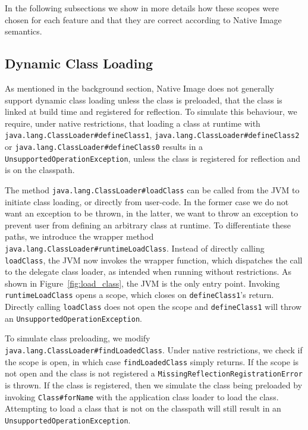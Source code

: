 In the following subsections we show in more details how these scopes were chosen for each feature and that they are correct according to Native Image semantics.

\subsection{Dynamic Class Loading}
As mentioned in the background section, Native Image does not generally support dynamic class loading unless the class is preloaded, that the class is linked at build time and registered for reflection.
To simulate this behaviour, we require, under native restrictions, that loading a class at runtime with \verb|java.lang.ClassLoader#defineClass1|, \verb|java.lang.ClassLoader#defineClass2| or \verb|java.lang.ClassLoader#defineClass0| results in a \verb|UnsupportedOperationException|, unless the class is registered for reflection and is on the classpath.

The method \verb|java.lang.ClassLoader#loadClass| can be called from the JVM to initiate class loading, or directly from user-code. In the former case we do not want an exception to be thrown, in the latter, we want to throw an exception to prevent user from defining an arbitrary class at runtime.
To differentiate these paths, we introduce the wrapper method \verb|java.lang.ClassLoader#runtimeLoadClass|. Instead of directly calling \verb|loadClass|, the JVM now invokes the wrapper function, which dispatches the call to the delegate class loader, as intended when running without restrictions. As shown in Figure~\ref{fig:load_class}, the JVM is the only entry point.
Invoking \verb|runtimeLoadClass| opens a scope, which closes on \verb|defineClass1|'s return.
Directly calling \verb|loadClass| does not open the scope and \verb|defineClass1| will throw an \verb|UnsupportedOperationException|.

To simulate class preloading, we modify \verb|java.lang.ClassLoader#findLoadedClass|.
Under native restrictions, we check if the scope is open, in which case \verb|findLoadedClass| simply returns. If the scope is not open and the class is not registered a \verb|MissingReflectionRegistrationError| is thrown.
If the class is registered, then we simulate the class being preloaded by invoking \verb|Class#forName| with the application class loader to load the class. Attempting to load a class that is not on the classpath will still result in an \verb|UnsupportedOperationException|.

